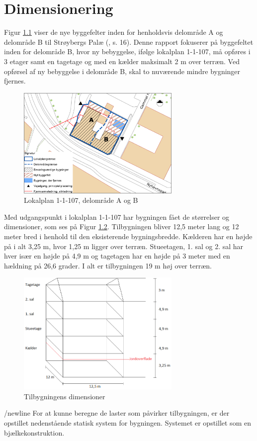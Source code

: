 \chapter{Dimensionering}

Figur \ref{fig:hej} viser de nye byggefelter inden for henholdsvis delområde A og delområde B til Strøybergs Palæ (\citep{lokalplan}, s. 16). Denne rapport fokuserer på byggefeltet inden for delområde B, hvor ny bebyggelse, ifølge lokalplan 1-1-107, må opføres i 3 etager samt en tagetage og med en kælder maksimalt 2 m over terræn. Ved opførsel af ny bebyggelse i delområde B, skal to nuværende mindre bygninger fjernes. 

\begin{figure}[htbp]
	\centering
	\includegraphics[width=0.7\textwidth]{billeder/signatur.png}
	\caption{Lokalplan 1-1-107, delområde A og B}
	\label{fig:hej}
\end{figure}

Med udgangspunkt i lokalplan 1-1-107 har bygningen fået de størrelser og dimensioner, som ses på Figur \ref{fig:farvel}.
\newline \indent{     }  Tilbygningen bliver 12,5 meter lang og 12 meter bred i henhold til den eksisterende bygningsbredde. Kælderen har en højde på i alt 3,25 m, hvor 1,25 m ligger over terræn. Stueetagen, 1. sal og 2. sal har hver især en højde på 4,9 m og tagetagen har en højde på 3 meter med en hældning på 26,6 grader. I alt er tilbygningen 19 m høj over terræn.

\begin{figure}[htbp]
	\centering
	\includegraphics[width=0.7\textwidth]{billeder/tilbygning2.png}
	\caption{Tilbygningens dimensioner}
	\label{fig:farvel}
\end{figure}
/newline
For at kunne beregne de laster som påvirker tilbygningen, er der opstillet nedenstående statisk system for bygningen. Systemet er opstillet som en bjælkekonstruktion.

